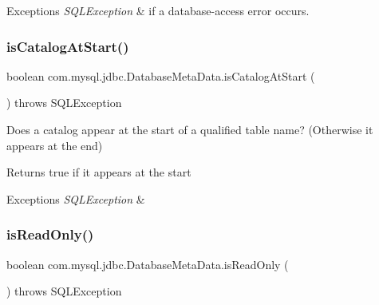 \begin{DoxyExceptions}{Exceptions}
{\em S\+Q\+L\+Exception} & if a database-\/access error occurs. \\
\hline
\end{DoxyExceptions}
\mbox{\label{classcom_1_1mysql_1_1jdbc_1_1_database_meta_data_a908de8843d8b2295146499fdab0c85fe}} 
\subsubsection{\texorpdfstring{is\+Catalog\+At\+Start()}{isCatalogAtStart()}}
{\footnotesize\ttfamily boolean com.\+mysql.\+jdbc.\+Database\+Meta\+Data.\+is\+Catalog\+At\+Start (\begin{DoxyParamCaption}{ }\end{DoxyParamCaption}) throws S\+Q\+L\+Exception}

Does a catalog appear at the start of a qualified table name? (Otherwise it appears at the end)

\begin{DoxyReturn}{Returns}
true if it appears at the start 
\end{DoxyReturn}

\begin{DoxyExceptions}{Exceptions}
{\em S\+Q\+L\+Exception} & \\
\hline
\end{DoxyExceptions}
\mbox{\label{classcom_1_1mysql_1_1jdbc_1_1_database_meta_data_a11f9977fccf76a455f725cef513e3b8d}} 
\subsubsection{\texorpdfstring{is\+Read\+Only()}{isReadOnly()}}
{\footnotesize\ttfamily boolean com.\+mysql.\+jdbc.\+Database\+Meta\+Data.\+is\+Read\+Only (\begin{DoxyParamCaption}{ }\end{DoxyParamCaption}) throws S\+Q\+L\+Exception}


